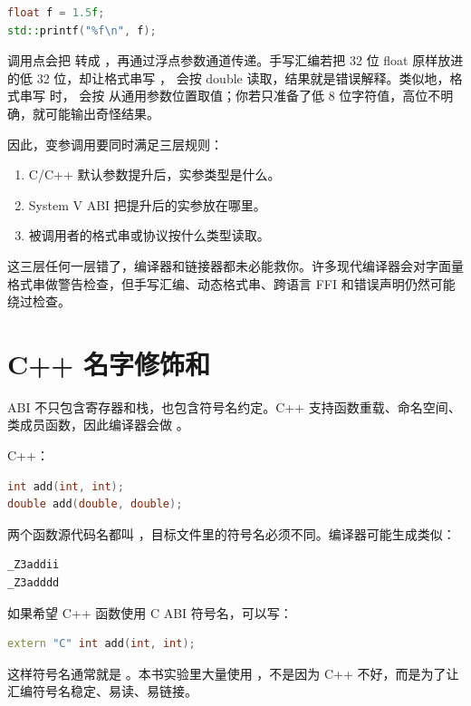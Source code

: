 \begin{lstlisting}[language=C++]
float f = 1.5f;
std::printf("%f\n", f);
\end{lstlisting}

调用点会把  转成 ，再通过浮点参数通道传递。手写汇编若把 32 位 float 原样放进  的低 32 位，却让格式串写 ， 会按 double 读取，结果就是错误解释。类似地，格式串写  时， 会按  从通用参数位置取值；你若只准备了低 8 位字符值，高位不明确，就可能输出奇怪结果。

因此，变参调用要同时满足三层规则：

\begin{enumerate}
  \item C/C++ 默认参数提升后，实参类型是什么。
  \item System V ABI 把提升后的实参放在哪里。
  \item 被调用者的格式串或协议按什么类型读取。
\end{enumerate}

这三层任何一层错了，编译器和链接器都未必能救你。许多现代编译器会对字面量格式串做警告检查，但手写汇编、动态格式串、跨语言 FFI 和错误声明仍然可能绕过检查。

\section{C++ 名字修饰和 }

ABI 不只包含寄存器和栈，也包含符号名约定。C++ 支持函数重载、命名空间、类成员函数，因此编译器会做 。

C++：

\begin{lstlisting}[language=C++]
int add(int, int);
double add(double, double);
\end{lstlisting}

两个函数源代码名都叫 ，目标文件里的符号名必须不同。编译器可能生成类似：

\begin{lstlisting}
_Z3addii
_Z3adddd
\end{lstlisting}

如果希望 C++ 函数使用 C ABI 符号名，可以写：

\begin{lstlisting}[language=C++]
extern "C" int add(int, int);
\end{lstlisting}

这样符号名通常就是 。本书实验里大量使用 ，不是因为 C++ 不好，而是为了让汇编符号名稳定、易读、易链接。

